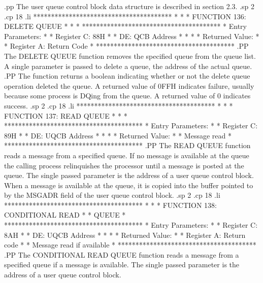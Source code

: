 .pp
The user queue control block data structure is described in section
2.3.
.sp 2
.cp 18
.li
***************************************
*                                     *
*  FUNCTION 136:  DELETE QUEUE        *
*                                     *
***************************************
*  Entry Parameters:                  *
*      Register   C:  88H             *
*                DE:  QCB Address     *
*                                     *
*  Returned   Value:                  *
*      Register   A:  Return Code     *
***************************************
.PP
The DELETE QUEUE function removes the specified
queue from the queue list.
A single parameter is passed to delete a queue, the address of the
actual queue.
.PP
The function returns a boolean indicating whether or not the delete
queue operation deleted the queue.  A returned value of
0FFH indicates failure, usually because some process is DQing from
the queue.  A returned value of 0 indicates success.
.sp 2
.cp 18
.li
***************************************
*                                     *
*  FUNCTION 137:  READ QUEUE          *
*                                     *
***************************************
*  Entry Parameters:                  *
*      Register   C:  89H             *
*                DE:  UQCB Address    *
*                                     *
*  Returned   Value:                  *
*      Message read                   *
***************************************
.PP
The READ QUEUE function reads a message from
a specified queue.  If no message is available at the queue the
calling process relinquishes the processor until a message is posted
at the queue.  The single passed parameter is the address of a user
queue control block.
When a message is available at the queue, it is copied into the
buffer pointed to by the MSGADR field of the user queue control block.
.sp 2
.cp 18
.li
***************************************
*                                     *
*  FUNCTION 138:  CONDITIONAL READ    *
*                 QUEUE               *
***************************************
*  Entry Parameters:                  *
*      Register   C:  8AH             *
*                DE:  UQCB Address    *
*                                     *
*  Returned   Value:                  *
*      Register   A:  Return code     *
*      Message read if available      *
***************************************
.PP
The CONDITIONAL READ QUEUE function reads
a message from a specified queue if a message is available.
The single passed parameter is the address of a user
queue control block.
